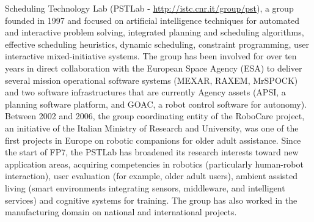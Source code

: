 \begin{itemize}
  Scheduling Technology Lab (PSTLab - \url{http://istc.cnr.it/group/pst}), a
  group founded in 1997 and focused on artificial intelligence
  techniques for automated and interactive problem solving, integrated
  planning and scheduling algorithms, effective scheduling heuristics,
  dynamic scheduling, constraint programming, user interactive
  mixed-initiative systems. The group has been involved for over ten
  years in direct collaboration with the European Space Agency (ESA) to
  deliver several mission operational software systems (MEXAR, RAXEM,
  MrSPOCK) and two software infrastructures that are currently Agency
  assets (APSI, a planning software platform, and GOAC, a robot control
  software for autonomy). Between 2002 and 2006, the group coordinating
  entity of the RoboCare project, an initiative of the Italian Ministry
  of Research and University, was one of the first projects in Europe on
  robotic companions for older adult assistance. Since the start of FP7,
  the PSTLab has broadened its research interests toward new application
  areas, acquiring competencies in robotics (particularly human-robot
  interaction), user evaluation (for example, older adult users),
  ambient assisted living (smart environments integrating sensors,
  middleware, and intelligent services) and cognitive systems for
  training. The group has also worked in the manufacturing domain on
  national and international projects.\textbf{\hfill\break}
\end{itemize}
